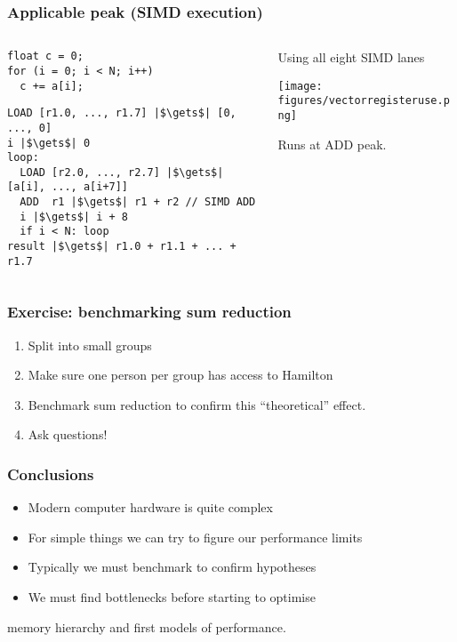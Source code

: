 \documentclass[dvipsnames,presentation,aspectratio=169,14pt]{beamer}
\begin{document}
\begin{frame}[fragile]
  \frametitle{Applicable peak (SIMD execution)}
  \begin{columns}
    \begin{column}{0.6\textwidth}\small

\begin{verbatim}
float c = 0;
for (i = 0; i < N; i++)
  c += a[i];
\end{verbatim}


\begin{verbatim}
LOAD [r1.0, ..., r1.7] |$\gets$| [0, ..., 0]
i |$\gets$| 0
loop:
  LOAD [r2.0, ..., r2.7] |$\gets$| [a[i], ..., a[i+7]]
  ADD  r1 |$\gets$| r1 + r2 // SIMD ADD
  i |$\gets$| i + 8
  if i < N: loop
result |$\gets$| r1.0 + r1.1 + ... + r1.7
\end{verbatim}

    \end{column}
    \begin{column}{0.3\textwidth}
      Using all eight SIMD lanes

      \begin{center}
        \texttt{[image: figures/vectorregisteruse.png]}
      \end{center}

      Runs at ADD peak.
    \end{column}
  \end{columns}
\end{frame}

\begin{frame}
  \frametitle{Exercise: benchmarking sum reduction}
  \begin{enumerate}[itemsep=8pt]
    \item Split into small groups
    \item Make sure one person per group has access to Hamilton
    \item Benchmark sum reduction to confirm this ``theoretical'' effect.
    \item Ask questions!
  \end{enumerate}
  \begin{center}
  \end{center}
\end{frame}

\begin{frame}
  \frametitle{Conclusions}
  \begin{itemize}[itemsep=11pt]
  \item Modern computer hardware is quite complex
  \item For simple things we can try to figure our performance limits
  \item Typically we must benchmark to confirm hypotheses
  \item We must find bottlenecks before starting to optimise
  \end{itemize}

  \vskip 20pt

   memory hierarchy and first models of performance.
\end{frame}
\end{document}
